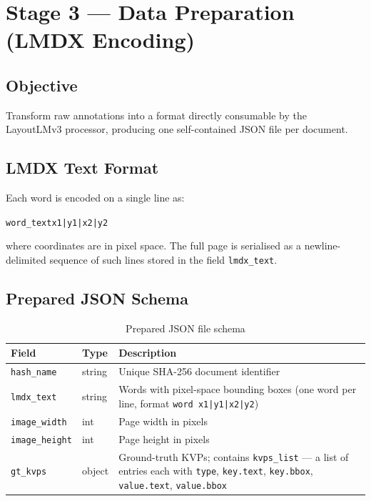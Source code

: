\documentclass[11pt,a4paper]{article}
\begin{document}
\section{Stage 3 --- Data Preparation (LMDX Encoding)}

\subsection*{Objective}
Transform raw annotations into a format directly consumable by the
LayoutLMv3 processor, producing one self-contained JSON file per document.

\subsection*{LMDX Text Format}
Each word is encoded on a single line as:
\begin{center}
  \texttt{word\_text\;x1|y1|x2|y2}
\end{center}
where coordinates are in pixel space. The full page is serialised as a
newline-delimited sequence of such lines stored in the field
\texttt{lmdx\_text}.

\subsection*{Prepared JSON Schema}

\begin{table}[h!]
  \centering
  \caption{Prepared JSON file schema}
  \label{tab:json}
  \begin{tabularx}{\textwidth}{llX}
    \toprule
    \textbf{Field} & \textbf{Type} & \textbf{Description} \\
    \midrule
    \texttt{hash\_name}   & string & Unique SHA-256 document identifier \\
    \texttt{lmdx\_text}   & string & Words with pixel-space bounding boxes
                                      (one word per line,
                                      format \texttt{word x1|y1|x2|y2}) \\
    \texttt{image\_width} & int    & Page width in pixels \\
    \texttt{image\_height}& int    & Page height in pixels \\
    \texttt{gt\_kvps}     & object & Ground-truth KVPs; contains
                                      \texttt{kvps\_list} --- a list of
                                      entries each with \texttt{type},
                                      \texttt{key.text}, \texttt{key.bbox},
                                      \texttt{value.text},
                                      \texttt{value.bbox} \\
    \bottomrule
  \end{tabularx}
\end{table}
\end{document}

